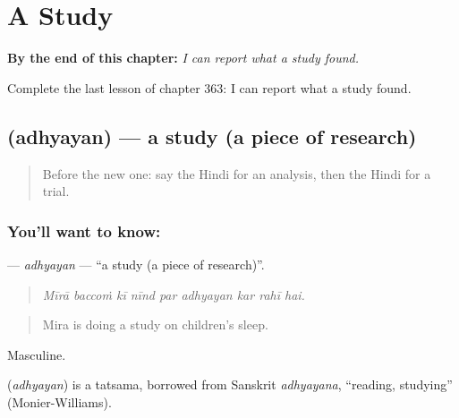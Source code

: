 
\chapter{A Study}
\label{ch:hi-a-study}

\begin{chapteropening}
\textbf{By the end of this chapter:} \emph{I can report what a study found.}

Complete the last lesson of chapter 363: I can report what a study found.
\end{chapteropening}

\section[\texorpdfstring{\hi{अध्ययन} (adhyayan)}{अध्ययन (adhyayan)}]{ (adhyayan) — a study (a piece of research)}

\label{lesson:HI-C363-adhyayan}



\begin{quote}
Before the new one: say the Hindi for an analysis, then the Hindi for a trial.
\end{quote}

\subsection*{You'll want to know: }
\textbf{} — \emph{adhyayan} — \textquotedblleft{}a study (a piece of research)\textquotedblright{}.

\begin{quote}
        
\end{quote}

\begin{quote}
\emph{Mīrā baccoṁ kī nīnd par adhyayan kar rahī hai.}
\end{quote}

\begin{quote}
Mira is doing a study on children's sleep.
\end{quote}

Masculine.

\begin{cousinweb}
\textbf{} (\emph{adhyayan}) is a tatsama, borrowed from Sanskrit \emph{adhyayana}, \textquotedblleft{}reading, studying\textquotedblright{} (Monier-Williams).
\end{cousinweb}

